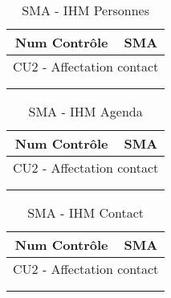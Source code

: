 

\begin{table}[H]
\centering
\caption{SMA - IHM Personnes}
\begin{tabular}{ll}
\hline
\multicolumn{1}{c}{Num Contrôle} & \multicolumn{1}{c}{SMA} \\ \hline
\multicolumn{2}{c}{CU2 - Affectation contact}              \\
                                 &                         \\
                                 &                         \\ \hline
\end{tabular}
\end{table}




\begin{table}[H]
\centering
\caption{SMA - IHM Agenda}
\begin{tabular}{ll}
\hline
\multicolumn{1}{c}{Num Contrôle} & \multicolumn{1}{c}{SMA} \\ \hline
\multicolumn{2}{c}{CU2 - Affectation contact}              \\
                                 &                         \\
                                 &                         \\ \hline
\end{tabular}
\end{table}



\begin{table}[H]
\centering
\caption{SMA - IHM Contact}
\begin{tabular}{ll}
\hline
\multicolumn{1}{c}{Num Contrôle} & \multicolumn{1}{c}{SMA} \\ \hline
\multicolumn{2}{c}{CU2 - Affectation contact}              \\
                                 &                         \\
                                 &                         \\ \hline
\end{tabular}
\end{table}